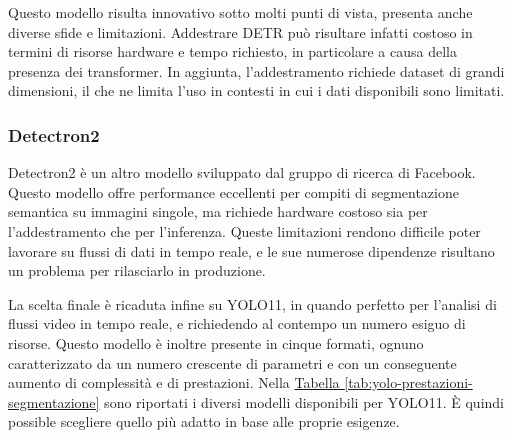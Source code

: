 \documentclass[12pt]{report}
\begin{document}
Questo modello risulta innovativo sotto molti punti di vista, presenta anche diverse sfide e limitazioni. Addestrare DETR può risultare infatti costoso in termini di risorse hardware e tempo richiesto, in particolare a causa della presenza dei transformer. In aggiunta, l'addestramento richiede dataset di grandi dimensioni, il che ne limita l'uso in contesti in cui i dati disponibili sono limitati.

\subsubsection{Detectron2}

Detectron2 è un altro modello sviluppato dal gruppo di ricerca di Facebook. Questo modello offre performance eccellenti per compiti di segmentazione semantica su immagini singole, ma richiede hardware costoso sia per l'addestramento che per l'inferenza. Queste limitazioni rendono difficile poter lavorare su flussi di dati in tempo reale, e le sue numerose dipendenze risultano un problema per rilasciarlo in produzione.

\vspace{10pt}

La scelta finale è ricaduta infine su YOLO11, in quando perfetto per l'analisi di flussi video in tempo reale, e richiedendo al contempo un numero esiguo di risorse. Questo modello è inoltre presente in cinque formati, ognuno caratterizzato da un numero crescente di parametri e con un conseguente aumento di complessità e di prestazioni. Nella \hyperref[tab:yolo-prestazioni-segmentazione]{Tabella \ref{tab:yolo-prestazioni-segmentazione}} sono riportati i diversi modelli disponibili per YOLO11. È quindi possible scegliere quello più adatto in base alle proprie esigenze.
\end{document}

